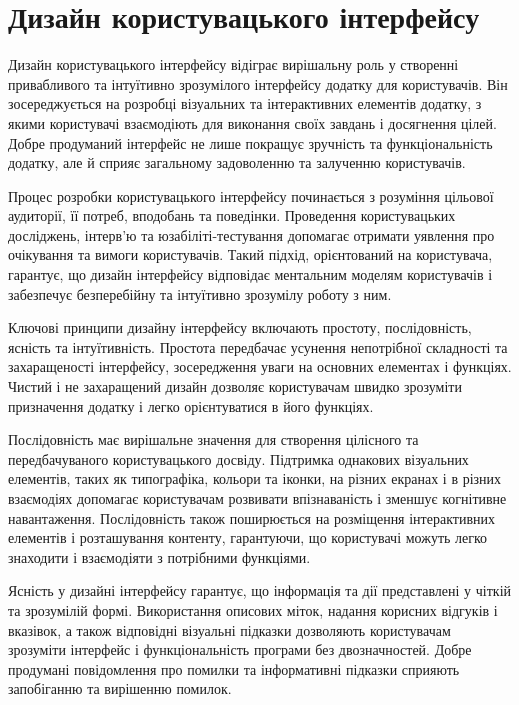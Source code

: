 \section{Дизайн користувацького інтерфейсу}
\label{sec:user-interface-design}

Дизайн користувацького інтерфейсу відіграє вирішальну роль у створенні привабливого та інтуїтивно зрозумілого інтерфейсу додатку для користувачів. Він зосереджується на розробці візуальних та інтерактивних елементів додатку, з якими користувачі взаємодіють для виконання своїх завдань і досягнення цілей. Добре продуманий інтерфейс не лише покращує зручність та функціональність додатку, але й сприяє загальному задоволенню та залученню користувачів.

Процес розробки користувацького інтерфейсу починається з розуміння цільової аудиторії, її потреб, вподобань та поведінки. Проведення користувацьких досліджень, інтерв'ю та юзабіліті-тестування допомагає отримати уявлення про очікування та вимоги користувачів. Такий підхід, орієнтований на користувача, гарантує, що дизайн інтерфейсу відповідає ментальним моделям користувачів і забезпечує безперебійну та інтуїтивно зрозумілу роботу з ним.

Ключові принципи дизайну інтерфейсу включають простоту, послідовність, ясність та інтуїтивність. Простота передбачає усунення непотрібної складності та захаращеності інтерфейсу, зосередження уваги на основних елементах і функціях. Чистий і не захаращений дизайн дозволяє користувачам швидко зрозуміти призначення додатку і легко орієнтуватися в його функціях.

Послідовність має вирішальне значення для створення цілісного та передбачуваного користувацького досвіду. Підтримка однакових візуальних елементів, таких як типографіка, кольори та іконки, на різних екранах і в різних взаємодіях допомагає користувачам розвивати впізнаваність і зменшує когнітивне навантаження. Послідовність також поширюється на розміщення інтерактивних елементів і розташування контенту, гарантуючи, що користувачі можуть легко знаходити і взаємодіяти з потрібними функціями.

Ясність у дизайні інтерфейсу гарантує, що інформація та дії представлені у чіткій та зрозумілій формі. Використання описових міток, надання корисних відгуків і вказівок, а також відповідні візуальні підказки дозволяють користувачам зрозуміти інтерфейс і функціональність програми без двозначностей. Добре продумані повідомлення про помилки та інформативні підказки сприяють запобіганню та вирішенню помилок.

